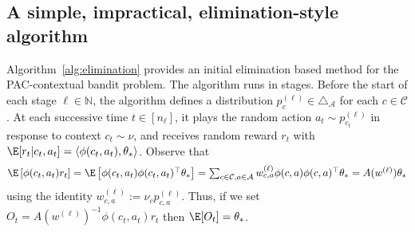 \documentclass{article}
\newcommand{\mc}[1]{\mathcal{#1}}
\newcommand{\1}{\mathbf{1}}
\begin{document}
\subsection{A simple, impractical, elimination-style algorithm}\label{sec:elim_alg}
Algorithm~\ref{alg:elimination} provides an initial elimination based method for the PAC-contextual bandit problem. 
The algorithm runs in stages. 
Before the start of each stage $\ell \in \mathbb{N}$, the algorithm defines a distribution $p^{(\ell)}_c \in \triangle_{\mc{A}}$ for each $c \in \mc{C}$. At each successive time $t\in [n_{\ell}]$, it plays the random action $a_t \sim p^{(\ell)}_{c_t}$ in response to context $c_t \sim \nu$, and receives random reward $r_t$ with $\E[r_t|c_t,a_t] = \langle \phi(c_t,a_t),\theta_* \rangle$. 
Observe that 
\[
   \textstyle \E\left[ \phi(c_t,a_t) r_t \right] = \E\left[  \phi(c_t,a_t) \phi(c_t,a_t)^\top \theta_* \right]
    =  \sum_{c \in \mc{C}, a \in \mc{A}} w^{(\ell)}_{c,a} \phi(c,a) \phi(c,a)^\top \theta_* = A(w^{(\ell)})\theta_*
\]
using the identity $w^{(\ell)}_{c,a} := \nu_c p^{(\ell)}_{c,a}$.
Thus, if we set $O_t = A(w^{(\ell)})^{-1} \phi(c_t,a_t) r_t$ then $\E[O_t] = \theta_*$.
\end{document}

